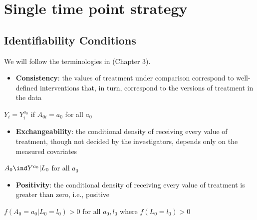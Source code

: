 \documentclass[dvipdfmx,10pt]{article}
\begin{document}
\section{Single time point strategy}
\label{sec:org3660bcc}
\subsection{Identifiability Conditions}
\label{sec:orgb817369}
We will follow the terminologies in \cite{hernanCausalInference2019} (Chapter 3).
\begin{itemize}
\item \textbf{Consistency}: the values of treatment under comparison correspond to well-defined interventions that, in turn, correspond to the versions of treatment in the data
\end{itemize}
\begin{center}
\(Y_{i} = Y_{i}^{a_{0}}\) if \(A_{0i} = a_{0}\) for all \(a_{0}\)
\end{center}
\begin{itemize}
\item \textbf{Exchangeability}: the conditional density of receiving every value of treatment, though not decided by the investigators, depends only on the measured covariates
\end{itemize}
\begin{center}
\(A_{0} \ind Y^{a_{0}} | L_{0}\) for all \(a_{0}\)
\end{center}
\begin{itemize}
\item \textbf{Positivity}: the conditional density of receiving every value of treatment is greater than zero, i.e., positive
\end{itemize}
\begin{center}
\(f(A_{0} = a_{0} | L_{0} = l_{0}) > 0\) for all \(a_{0},l_{0}\) where \(f(L_{0} = l_{0}) > 0\)
\end{center}
\end{document}
